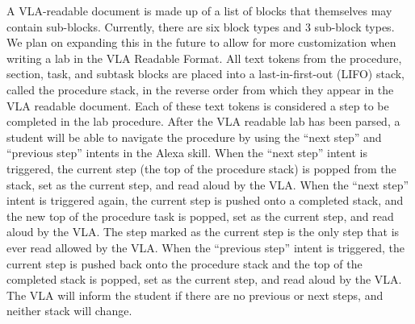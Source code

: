 \documentclass[11.5pt]{sig-alternate} %
\begin{document}
\begin{large}
A VLA-readable document is made up of a list of blocks that themselves may contain sub-blocks. Currently, there are six block types and 3 sub-block types. We plan on expanding this in the future to allow for more customization when writing a lab in the VLA Readable Format. All text tokens from the procedure, section, task, and subtask blocks are placed into a last-in-first-out (LIFO) stack, called the procedure stack, in the reverse order from which they appear in the VLA readable document. Each of these text tokens is considered a step to be completed in the lab procedure. After the VLA readable lab has been parsed, a student will be able to navigate the procedure by using the “next step” and “previous step” intents in the Alexa skill. When the “next step” intent is triggered, the current step (the top of the procedure stack) is popped from the stack, set as the current step, and read aloud by the VLA.  When the “next step” intent is triggered again, the current step is pushed onto a completed stack, and the new top of the procedure task is popped, set as the current step, and read aloud by the VLA. The step marked as the current step is the only step that is ever read allowed by the VLA. When the “previous step” intent is triggered, the current step is pushed back onto the procedure stack and the top of the completed stack is popped, set as the current step, and read aloud by the VLA. The VLA will inform the student if there are no previous or next steps, and neither stack will change.


\end{large}
\end{document}

